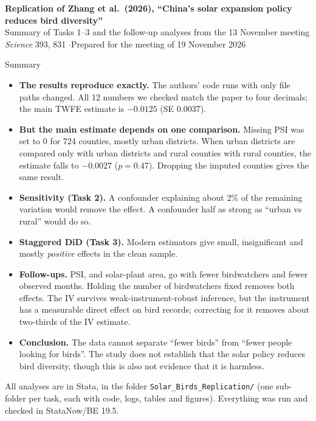 \documentclass[11pt]{article}
\begin{document}
\begin{center}
{\Large\bfseries Replication of Zhang et al.\ (2026), ``China's solar expansion policy reduces bird diversity''}\\[5pt]
{\large Summary of Tasks 1--3 and the follow-up analyses from the 13 November meeting}\\[4pt]
{\small \textit{Science} 393, 831 \quad$\cdot$\quad Prepared for the meeting of 19 November 2026}
\end{center}

\begin{keybox}{Summary}
\begin{itemize}[leftmargin=14pt]
\item \textbf{The results reproduce exactly.} The authors' code runs with only file paths changed. All 12 numbers we checked match the paper to four decimals; the main TWFE estimate is $-0.0125$ (SE 0.0037).
\item \textbf{But the main estimate depends on one comparison.} Missing PSI was set to 0 for 724 counties, mostly urban districts. When urban districts are compared only with urban districts and rural counties with rural counties, the estimate falls to $-0.0027$ ($p=0.47$). Dropping the imputed counties gives the same result.
\item \textbf{Sensitivity (Task 2).} A confounder explaining about 2\% of the remaining variation would remove the effect. A confounder half as strong as ``urban vs rural'' would do so.
\item \textbf{Staggered DiD (Task 3).} Modern estimators give small, insignificant and mostly \emph{positive} effects in the clean sample.
\item \textbf{Follow-ups.} PSI, and solar-plant area, go with fewer birdwatchers and fewer observed months. Holding the number of birdwatchers fixed removes both effects. The IV survives weak-instrument-robust inference, but the instrument has a measurable direct effect on bird records; correcting for it removes about two-thirds of the IV estimate.
\item \textbf{Conclusion.} The data cannot separate ``fewer birds'' from ``fewer people looking for birds''. The study does not establish that the solar policy reduces bird diversity, though this is also not evidence that it is harmless.
\end{itemize}
\end{keybox}

All analyses are in Stata, in the folder \texttt{Solar\_Birds\_Replication/} (one sub-folder per task, each with code, logs, tables and figures). Everything was run and checked in StataNow/BE 19.5.
\end{document}
